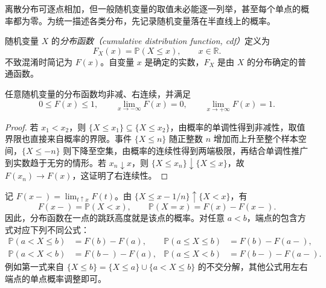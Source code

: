 离散分布可逐点相加，但一般随机变量的取值未必能逐一列举，甚至每个单点的概率都为零。为统一描述各类分布，先记录随机变量落在半直线上的概率。

\begin{definition}
\label{def:study-cdf}
随机变量 $X$ 的\emph{分布函数（cumulative distribution function, cdf）}定义为
\begin{equation}
  F_X(x)=\mathbb P(X\le x),\qquad x\in\mathbb R.
  \label{eq:study-cdf-definition}
\end{equation}
不致混淆时简记为 $F(x)$。自变量 $x$ 是确定的实数，$F_X$ 是由 $X$ 的分布确定的普通函数。
\end{definition}

\begin{proposition}[分布函数的基本性质]
\label{prop:study-cdf-properties}
任意随机变量的分布函数均非减、右连续，并满足
\begin{equation}
  0\le F(x)\le1,\qquad
  \lim_{x\to-\infty}F(x)=0,\qquad
  \lim_{x\to+\infty}F(x)=1.
  \label{eq:study-cdf-properties}
\end{equation}
\end{proposition}

\begin{proof}
若 $x_1<x_2$，则 $\{X\le x_1\}\subseteq\{X\le x_2\}$，由概率的单调性得到非减性，取值界限也直接来自概率的界限。事件 $\{X\le n\}$ 随正整数 $n$ 增加而上升至整个样本空间，$\{X\le-n\}$ 则下降至空集，由概率的连续性得到两端极限，再结合单调性推广到实数趋于无穷的情形。若 $x_n\downarrow x$，则 $\{X\le x_n\}\downarrow\{X\le x\}$，故 $F(x_n)\to F(x)$，这证明了右连续性。
\end{proof}

记 $F(x-)=\lim_{t\uparrow x}F(t)$。由 $\{X\le x-1/n\}\uparrow\{X<x\}$，有
\begin{equation}
  F(x-)=\mathbb P(X<x),\qquad
  \mathbb P(X=x)=F(x)-F(x-).
  \label{eq:study-cdf-atom}
\end{equation}
因此，分布函数在一点的跳跃高度就是该点的概率。对任意 $a<b$，端点的包含方式对应下列不同公式：
\begin{equation}
  \begin{aligned}
    \mathbb P(a<X\le b)&=F(b)-F(a),&
    \mathbb P(a\le X\le b)&=F(b)-F(a-),\\
    \mathbb P(a<X<b)&=F(b-)-F(a),&
    \mathbb P(a\le X<b)&=F(b-)-F(a-).
  \end{aligned}
  \label{eq:study-cdf-intervals}
\end{equation}
例如第一式来自 $\{X\le b\}=\{X\le a\}\cup\{a<X\le b\}$ 的不交分解，其他公式用左右端点的单点概率调整即可。

